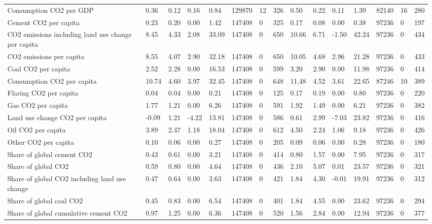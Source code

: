 \begin{longtable}{lllllllllllllll}
Consumption CO2 per GDP & 0.36 & 0.12 & 0.16 & 0.84 & 129870 & 12 & 326 & 0.50 & 0.22 & 0.11 & 1.39 & 82140 & 16 & 280\\
\addlinespace
Cement CO2 per capita & 0.23 & 0.20 & 0.00 & 1.42 & 147408 & 0 & 325 & 0.17 & 0.08 & 0.00 & 0.38 & 97236 & 0 & 197\\
CO2 emissions including land use change per capita & 8.45 & 4.33 & 2.08 & 33.09 & 147408 & 0 & 650 & 10.66 & 6.71 & -1.50 & 42.24 & 97236 & 0 & 434\\
CO2 emissions per capita & 8.55 & 4.07 & 2.90 & 32.18 & 147408 & 0 & 650 & 10.05 & 4.68 & 2.96 & 21.28 & 97236 & 0 & 433\\
Coal CO2 per capita & 2.52 & 2.28 & 0.00 & 16.53 & 147408 & 0 & 599 & 3.20 & 2.90 & 0.00 & 11.98 & 97236 & 0 & 414\\
Consumption CO2 per capita & 10.74 & 4.60 & 3.97 & 32.45 & 147408 & 0 & 648 & 11.48 & 4.52 & 3.61 & 22.65 & 87246 & 10 & 389\\
\addlinespace
Flaring CO2 per capita & 0.04 & 0.04 & 0.00 & 0.21 & 147408 & 0 & 125 & 0.17 & 0.19 & 0.00 & 0.80 & 97236 & 0 & 220\\
Gas CO2 per capita & 1.77 & 1.21 & 0.00 & 6.26 & 147408 & 0 & 591 & 1.92 & 1.49 & 0.00 & 6.21 & 97236 & 0 & 382\\
Land use change CO2 per capita & -0.09 & 1.21 & -4.22 & 13.81 & 147408 & 0 & 586 & 0.61 & 2.99 & -7.03 & 23.82 & 97236 & 0 & 416\\
Oil CO2 per capita & 3.89 & 2.47 & 1.18 & 18.04 & 147408 & 0 & 612 & 4.50 & 2.24 & 1.06 & 9.18 & 97236 & 0 & 426\\
Other CO2 per capita & 0.10 & 0.06 & 0.00 & 0.27 & 147408 & 0 & 205 & 0.09 & 0.06 & 0.00 & 0.28 & 97236 & 0 & 180\\
\addlinespace
Share of global cement CO2 & 0.43 & 0.61 & 0.00 & 3.21 & 147408 & 0 & 414 & 0.80 & 1.57 & 0.00 & 7.95 & 97236 & 0 & 317\\
Share of global CO2 & 0.59 & 0.80 & 0.00 & 4.64 & 147408 & 0 & 436 & 2.10 & 5.07 & 0.01 & 23.57 & 97236 & 0 & 321\\
Share of global CO2 including land use change & 0.47 & 0.64 & 0.00 & 3.63 & 147408 & 0 & 421 & 1.84 & 4.30 & -0.01 & 19.91 & 97236 & 0 & 312\\
Share of global coal CO2 & 0.45 & 0.83 & 0.00 & 6.54 & 147408 & 0 & 401 & 1.84 & 4.55 & 0.00 & 23.62 & 97236 & 0 & 294\\
Share of global cumulative cement CO2 & 0.97 & 1.25 & 0.00 & 6.36 & 147408 & 0 & 520 & 1.56 & 2.84 & 0.00 & 12.94 & 97236 & 0 & 377\\

\end{longtable}
